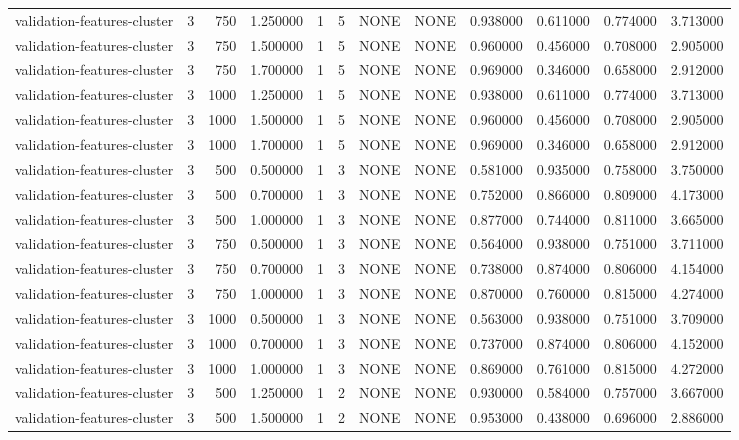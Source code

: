 \begin{tabular}{lrrrllllrrrr}
validation-features-cluster & 3 & 750 & 1.250000 & 1 & 5 & NONE & NONE & 0.938000 & 0.611000 & 0.774000 & 3.713000 \\
validation-features-cluster & 3 & 750 & 1.500000 & 1 & 5 & NONE & NONE & 0.960000 & 0.456000 & 0.708000 & 2.905000 \\
validation-features-cluster & 3 & 750 & 1.700000 & 1 & 5 & NONE & NONE & 0.969000 & 0.346000 & 0.658000 & 2.912000 \\
validation-features-cluster & 3 & 1000 & 1.250000 & 1 & 5 & NONE & NONE & 0.938000 & 0.611000 & 0.774000 & 3.713000 \\
validation-features-cluster & 3 & 1000 & 1.500000 & 1 & 5 & NONE & NONE & 0.960000 & 0.456000 & 0.708000 & 2.905000 \\
validation-features-cluster & 3 & 1000 & 1.700000 & 1 & 5 & NONE & NONE & 0.969000 & 0.346000 & 0.658000 & 2.912000 \\
validation-features-cluster & 3 & 500 & 0.500000 & 1 & 3 & NONE & NONE & 0.581000 & 0.935000 & 0.758000 & 3.750000 \\
validation-features-cluster & 3 & 500 & 0.700000 & 1 & 3 & NONE & NONE & 0.752000 & 0.866000 & 0.809000 & 4.173000 \\
validation-features-cluster & 3 & 500 & 1.000000 & 1 & 3 & NONE & NONE & 0.877000 & 0.744000 & 0.811000 & 3.665000 \\
validation-features-cluster & 3 & 750 & 0.500000 & 1 & 3 & NONE & NONE & 0.564000 & 0.938000 & 0.751000 & 3.711000 \\
validation-features-cluster & 3 & 750 & 0.700000 & 1 & 3 & NONE & NONE & 0.738000 & 0.874000 & 0.806000 & 4.154000 \\
validation-features-cluster & 3 & 750 & 1.000000 & 1 & 3 & NONE & NONE & 0.870000 & 0.760000 & 0.815000 & 4.274000 \\
validation-features-cluster & 3 & 1000 & 0.500000 & 1 & 3 & NONE & NONE & 0.563000 & 0.938000 & 0.751000 & 3.709000 \\
validation-features-cluster & 3 & 1000 & 0.700000 & 1 & 3 & NONE & NONE & 0.737000 & 0.874000 & 0.806000 & 4.152000 \\
validation-features-cluster & 3 & 1000 & 1.000000 & 1 & 3 & NONE & NONE & 0.869000 & 0.761000 & 0.815000 & 4.272000 \\
validation-features-cluster & 3 & 500 & 1.250000 & 1 & 2 & NONE & NONE & 0.930000 & 0.584000 & 0.757000 & 3.667000 \\
validation-features-cluster & 3 & 500 & 1.500000 & 1 & 2 & NONE & NONE & 0.953000 & 0.438000 & 0.696000 & 2.886000 \\

\end{tabular}
